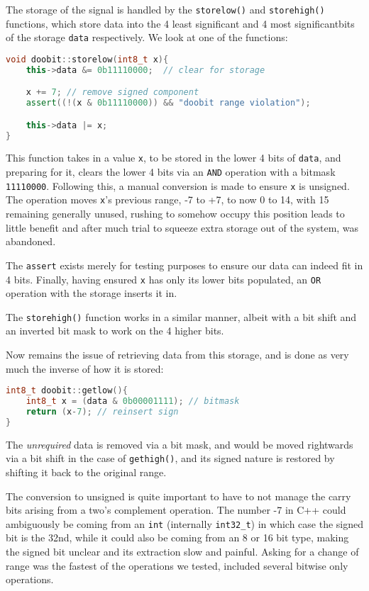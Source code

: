 The storage of the signal is handled by the \texttt{storelow()} and
\texttt{storehigh()} functions, which store data into the 4 least significant
and 4 most significantbits of the storage \texttt{data} respectively. We look at
one of the functions:

\begin{lstlisting}[language=C++]
void doobit::storelow(int8_t x){
	this->data &= 0b11110000;  // clear for storage

	x += 7; // remove signed component
	assert((!(x & 0b11110000)) && "doobit range violation");

	this->data |= x;
}
\end{lstlisting}

This function takes in a value \texttt{x}, to be stored in the lower 4 bits of
\texttt{data}, and preparing for it, clears the lower 4 bits via an \texttt{AND}
operation with a bitmask \texttt{11110000}. Following this, a manual conversion
is made to ensure \texttt{x} is unsigned. The operation moves \texttt{x}'s
previous range, -7 to +7, to now 0 to 14, with 15 remaining generally unused,
rushing to somehow occupy this position leads to little benefit and after much
trial to squeeze extra storage out of the system, was abandoned. 

The \texttt{assert} exists merely for testing purposes to ensure our data can
indeed fit in 4 bits. Finally, having ensured \texttt{x} has only its lower bits
populated, an \texttt{OR} operation with the storage inserts it in.

The \texttt{storehigh()} function works in a similar manner, albeit with a bit
shift and an inverted bit mask to work on the 4 higher bits.

Now remains the issue of retrieving data from this storage, and is done as very
much the inverse of how it is stored:

\begin{lstlisting}[language=C++]
int8_t doobit::getlow(){
    int8_t x = (data & 0b00001111); // bitmask
    return (x-7); // reinsert sign
}
\end{lstlisting}

The \emph{unrequired} data is removed via a bit mask, and would be moved
rightwards via a bit shift in the case of \texttt{gethigh()}, and its signed
nature is restored by shifting it back to the original range.

The conversion to unsigned is quite important to have to not manage the carry
bits arising from a two's complement operation. The number -7 in C++ could
ambiguously be coming from an \texttt{int} (internally \texttt{int32\_t}) in
which case the signed bit is the 32nd, while it could also be coming from an 8
or 16 bit type, making the signed bit unclear and its extraction slow and
painful. Asking for a change of range was the fastest of the operations we
tested, included several bitwise only operations.

